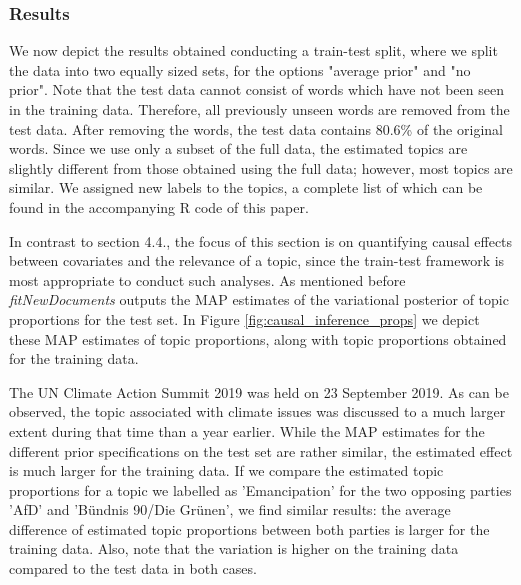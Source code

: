 \subsubsection{Results}

We now depict the results obtained conducting a train-test split, where we split the data into two equally sized sets, for the options "average prior" and "no prior". Note that the test data cannot consist of words which have not been seen in the training data. Therefore, all previously unseen words are removed from the test data. After removing the words, the test data contains 80.6\% of the original words. Since we use only a subset of the full data, the estimated topics are slightly different from those obtained using the full data; however, most topics are similar. We assigned new labels to the topics, a complete list of which can be found in the accompanying R code of this paper.

In contrast to section 4.4., the focus of this section is on quantifying causal effects between covariates and the relevance of a topic, since the train-test framework is most appropriate to conduct such analyses. As mentioned before \textit{fitNewDocuments} outputs the MAP estimates of the variational posterior of topic proportions for the test set. In Figure \ref{fig:causal_inference_props} we depict these MAP estimates of topic proportions, along with topic proportions obtained for the training data.

The UN Climate Action Summit 2019 was held on 23 September 2019. As can be observed, the topic associated with climate issues was discussed to a much larger extent during that time than a year earlier. While the MAP estimates for the different prior specifications on the test set are rather similar, the estimated effect is much larger for the training data. If we compare the estimated topic proportions for a topic we labelled as 'Emancipation' for the two opposing parties 'AfD' and 'B{\"u}ndnis 90/Die Gr{\"u}nen', we find similar results: the average difference of estimated topic proportions between both parties is larger for the training data. Also, note that the variation is higher on the training data compared to the test data in both cases.

